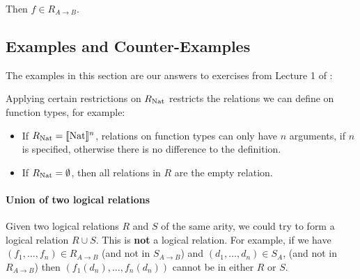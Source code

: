 Then $f \in R_{A \to B}$.

%
%
%
%
%
%

\subsection{Examples and Counter-Examples}

The examples in this section are our answers to  exercises from Lecture 1 of \citep{Murawski12}:

Applying certain restrictions on $R_{\operatorname{Nat}}$ restricts the relations we can define on function types, for example:

\begin{itemize}
\item{If $R_{\operatorname{Nat}} = \llbracket \operatorname{Nat} \rrbracket^n$, relations on function types can only have $n$ arguments, if $n$ is specified, otherwise 
there is no difference to the definition.}
\item{If $R_{\operatorname{Nat}} = \emptyset$, then all relations in $R$ are the empty relation.}
\end{itemize}

\paragraph{Union of two logical relations}
Given two logical relations $R$ and $S$ of the same arity, we could try to form a logical relation $R \cup S$. This is \textbf{not} a logical relation. For example, if we have $(f_1, \dots , f_n) \in R_{A \to B}$ (and not in $S_{A \to B}$) and $(d_1, \dots , d_n) \in S_A$, (and not in $R_{A \to B}$)  then $(f_1(d_n), \dots , f_n(d_n))$ cannot be in either $R$ or $S$.

